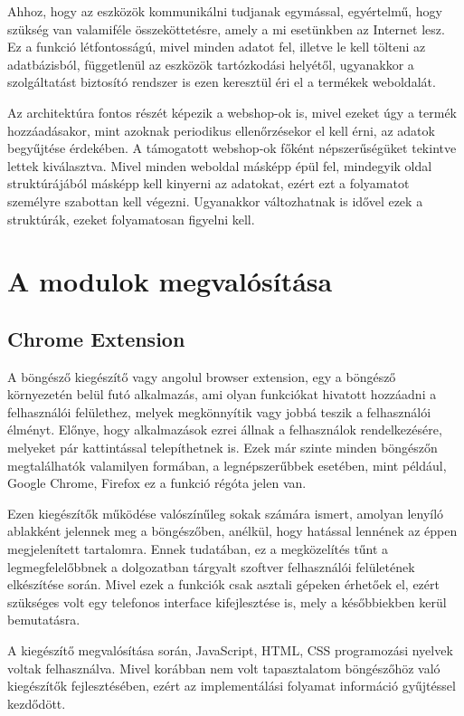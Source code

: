 Ahhoz, hogy az eszközök kommunikálni tudjanak egymással, egyértelmű, hogy szükség van valamiféle összeköttetésre, amely a mi esetünkben az Internet lesz. Ez a funkció létfontosságú, mivel minden adatot fel, illetve le kell tölteni az adatbázisból, függetlenül az eszközök tartózkodási helyétől, ugyanakkor a szolgáltatást biztosító rendszer is ezen keresztül éri el a termékek weboldalát.

Az architektúra fontos részét képezik a webshop-ok is, mivel ezeket úgy a termék hozzáadásakor, mint azoknak periodikus ellenőrzésekor el kell érni, az adatok begyűjtése érdekében. A támogatott webshop-ok főként népszerűségüket tekintve lettek kiválasztva. Mivel minden weboldal másképp épül fel, mindegyik oldal struktúrájából másképp kell kinyerni az adatokat, ezért ezt a folyamatot személyre szabottan kell végezni. Ugyanakkor változhatnak is idővel ezek a struktúrák, ezeket folyamatosan figyelni kell. 

\section{A modulok megvalósítása}

\subsection{Chrome Extension}

A böngésző kiegészítő vagy angolul browser extension, egy a böngésző környezetén belül futó alkalmazás, ami olyan funkciókat hivatott hozzáadni a felhasználói felülethez, melyek megkönnyítik vagy jobbá teszik a felhasználói élményt. Előnye, hogy alkalmazások ezrei állnak a felhasználok rendelkezésére, melyeket pár kattintással telepíthetnek is. Ezek már szinte minden böngészőn megtalálhatók valamilyen formában, a legnépszerűbbek esetében, mint például, Google Chrome, Firefox ez a funkció régóta jelen van.

Ezen kiegészítők működése valószínűleg sokak számára ismert, amolyan lenyíló ablakként jelennek meg a böngészőben, anélkül, hogy hatással lennének az éppen megjelenített tartalomra. Ennek tudatában, ez a megközelítés tűnt a legmegfelelőbbnek a dolgozatban tárgyalt szoftver felhasználói felületének elkészítése során. Mivel ezek a funkciók csak asztali gépeken érhetőek el, ezért szükséges volt egy telefonos interface kifejlesztése is, mely a későbbiekben kerül bemutatásra.

A kiegészítő megvalósítása során, JavaScript, HTML, CSS programozási nyelvek voltak felhasználva. Mivel korábban nem volt tapasztalatom böngészőhöz való kiegészítők fejlesztésében, ezért az implementálási folyamat információ gyűjtéssel kezdődött.

